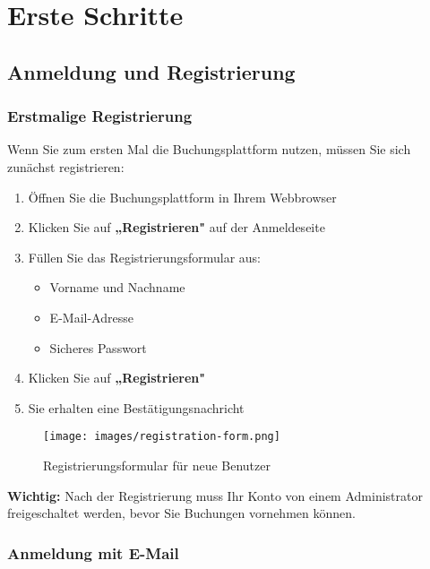 \section{Erste Schritte}
\label{sec:erste-schritte}

\subsection{Anmeldung und Registrierung}

\subsubsection{Erstmalige Registrierung}

Wenn Sie zum ersten Mal die Buchungsplattform nutzen, müssen Sie sich zunächst registrieren:

\begin{enumerate}
    \item Öffnen Sie die Buchungsplattform in Ihrem Webbrowser
    \item Klicken Sie auf \textbf{„Registrieren"} auf der Anmeldeseite
    \item Füllen Sie das Registrierungsformular aus:
        \begin{itemize}
            \item Vorname und Nachname
            \item E-Mail-Adresse
            \item Sicheres Passwort
        \end{itemize}
    \item Klicken Sie auf \textbf{„Registrieren"}
    \item Sie erhalten eine Bestätigungsnachricht
\end{enumerate}

\begin{figure}[H]
    \centering
    \texttt{[image: images/registration-form.png]}
    \caption{Registrierungsformular für neue Benutzer}
    \label{fig:registration}
\end{figure}

\textbf{Wichtig:} Nach der Registrierung muss Ihr Konto von einem Administrator freigeschaltet werden, bevor Sie Buchungen vornehmen können.

\subsubsection{Anmeldung mit E-Mail}

